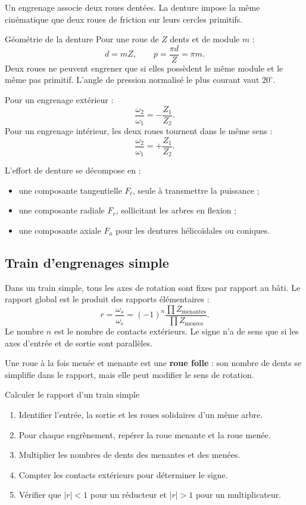 Un engrenage associe deux roues dentées. La denture impose la même
cinématique que deux roues de friction sur leurs cercles primitifs.

\begin{center}\TLEngrenageSimple\end{center}

\begin{TLThreeDef}{Géométrie de la denture}
Pour une roue de $Z$ dents et de module $m$ :
\[
\boxed{d=mZ,}
\qquad
\boxed{p=\frac{\pi d}{Z}=\pi m.}
\]
Deux roues ne peuvent engrener que si elles possèdent le même module et
le même pas primitif. L'angle de pression normalisé le plus courant vaut
$20^\circ$.
\end{TLThreeDef}

Pour un engrenage extérieur :
\[
\boxed{\frac{\omega_2}{\omega_1}=-\frac{Z_1}{Z_2}.}
\]
Pour un engrenage intérieur, les deux roues tournent dans le même sens :
\[
\boxed{\frac{\omega_2}{\omega_1}=+\frac{Z_1}{Z_2}.}
\]

L'effort de denture se décompose en :
\begin{itemize}
  \item une composante tangentielle $F_t$, seule à transmettre la puissance ;
  \item une composante radiale $F_r$, sollicitant les arbres en flexion ;
  \item une composante axiale $F_a$ pour les dentures hélicoïdales ou coniques.
\end{itemize}

\subsection{Train d'engrenages simple}

Dans un train simple, tous les axes de rotation sont fixes par rapport au
bâti. Le rapport global est le produit des rapports élémentaires :
\[
\boxed{r=\frac{\omega_s}{\omega_e}
=(-1)^n\frac{\prod Z_{\text{menantes}}}
{\prod Z_{\text{menées}}}.}
\]
Le nombre $n$ est le nombre de contacts extérieurs. Le signe n'a de sens
que si les axes d'entrée et de sortie sont parallèles.

Une roue à la fois menée et menante est une \textbf{roue folle} : son
nombre de dents se simplifie dans le rapport, mais elle peut modifier le
sens de rotation.

\begin{TLThreeMethod}{Calculer le rapport d'un train simple}
\begin{enumerate}
  \item Identifier l'entrée, la sortie et les roues solidaires d'un même arbre.
  \item Pour chaque engrènement, repérer la roue menante et la roue menée.
  \item Multiplier les nombres de dents des menantes et des menées.
  \item Compter les contacts extérieurs pour déterminer le signe.
  \item Vérifier que $|r|<1$ pour un réducteur et $|r|>1$ pour un multiplicateur.
\end{enumerate}
\end{TLThreeMethod}

